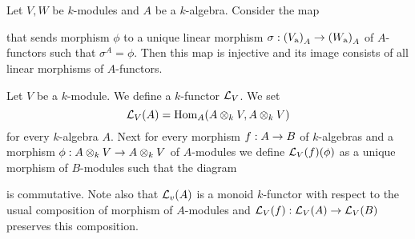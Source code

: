 \begin{corollary}\label{corollary:idenitificationoflinearmorphismsoffunctors}
Let $V, W$ be $k$-modules and $A$ be a $k$-algebra. Consider the map
\begin{center}
\end{center}
that sends morphism $\phi$ to a unique linear morphism $\sigma:\left(V_{\mathrm{a}}\right)_A\rightarrow \left(W_{\mathrm{a}}\right)_A$ of $A$-functors such that $\sigma^A = \phi$. Then this map is injective and its image consists of all linear morphisms of $A$-functors.
\end{corollary}

\begin{example}
Let $V$ be a $k$-module. We define a $k$-functor ${\mathcal L}_V$. We set
$${\mathcal L}_V(A) = \mathrm{Hom}_A(A\otimes_kV,A\otimes_kV)$$
for every $k$-algebra $A$. Next for every morphism $f:A\rightarrow B$ of $k$-algebras and a morphism $\phi:A\otimes_kV\rightarrow A\otimes_kV$ of $A$-modules we define ${\mathcal L}_V(f)(\phi)$ as a unique morphism of $B$-modules such that the diagram
\begin{center}
\end{center}
is commutative. Note also that ${\mathcal L}_v(A)$ is a monoid $k$-functor with respect to the usual composition of morphism of $A$-modules and ${\mathcal L}_V(f):{\mathcal L}_V(A)\rightarrow {\mathcal L}_V(B)$ preserves this composition.
\end{example}

